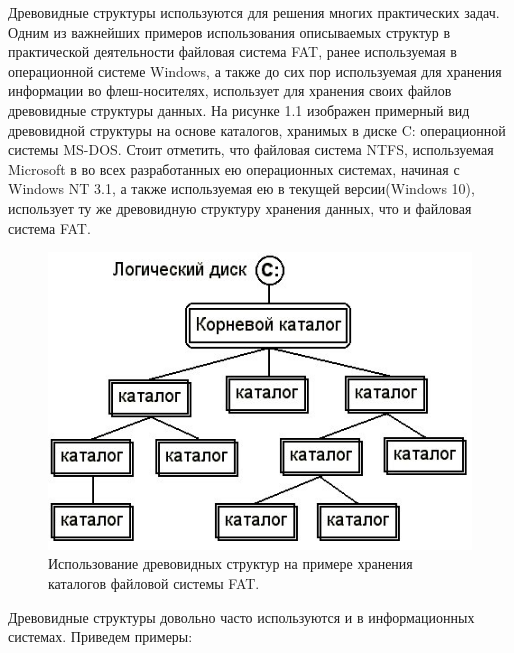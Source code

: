 \documentclass[a4paper,14pt]{extreport}
\theoremstyle{definition}
\begin{document}
Древовидные структуры используются для решения многих практических задач\cite{Yablonsky}. Одним из важнейших примеров использования описываемых структур в практической деятельности файловая система FAT, ранее используемая в операционной системе Windows, а также до сих пор используемая для хранения информации во флеш-носителях, использует для хранения своих файлов древовидные структуры данных. На рисунке 1.1 изображен примерный вид древовидной структуры на основе каталогов, хранимых в диске C: операционной системы MS-DOS.  Стоит отметить, что файловая система NTFS, используемая Microsoft в во всех разработанных ею операционных системах, начиная с Windows NT 3.1, а также используемая ею в текущей версии(Windows 10), использует ту же древовидную структуру хранения данных, что и файловая система FAT.
\begin{figure}[t!]
\begin{center}
\includegraphics[width=12cm]{38.jpg}
\caption{Использование древовидных структур на примере хранения каталогов файловой системы FAT.}
\label{fig:3}
\end{center}
\end{figure}

Древовидные структуры довольно часто используются и в информационных системах. Приведем примеры:
\end{document}
